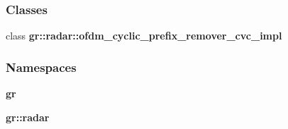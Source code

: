 \subsubsection*{Classes}
\begin{DoxyCompactItemize}
\item 
class {\bf gr\+::radar\+::ofdm\+\_\+cyclic\+\_\+prefix\+\_\+remover\+\_\+cvc\+\_\+impl}
\end{DoxyCompactItemize}
\subsubsection*{Namespaces}
\begin{DoxyCompactItemize}
\item 
 {\bf gr}
\item 
 {\bf gr\+::radar}
\end{DoxyCompactItemize}
